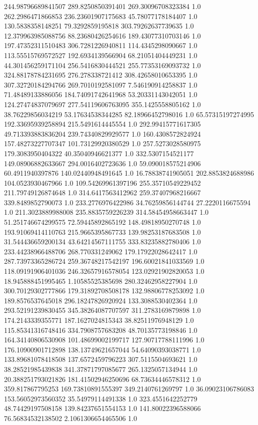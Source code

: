 244.98796689841507	289.8250850391401	269.30096708323384	1.0
262.2986471866853	236.23601907175683	45.78077178184407	1.0
130.5838358148251	79.3292859195818	303.79262637739635	1.0
12.379963985088756	88.23680426254616	189.43077310703146	1.0
197.47352311510483	306.7281226940811	114.4345298090667	1.0
113.55515769572527	192.6934139566904	68.21051404449231	1.0
44.301456259171104	256.5416830444521	255.77353169093732	1.0
324.88178784231695	276.278338721412	308.42658010653395	1.0
307.32720184294766	269.7010192581097	7.546190914258837	1.0
71.48489133886056	184.74091742641968	53.20331143042051	1.0
124.27474837079697	277.54119606763095	355.1425558805162	1.0
38.76229856034219	53.17634538344285	82.18966452798016	1.0
65.57315197274995	192.33695939258894	215.5491614445554	1.0
292.99415771617305	49.713393883836204	239.74340829929577	1.0
160.4308572824924	157.48273227707347	101.73129920380529	1.0
257.5273028580975	179.3083950404322	40.35040946621377	1.0
332.5307154521177	149.08906882633667	294.0016402723636	1.0
59.090018575214906	60.4911940397876	140.02440948491645	1.0
16.78838741905051	202.8853824688986	104.0523930467966	1.0
109.54269961397196	255.35710549229452	211.79749126874648	1.0
314.6417563412962	259.37407968216667	339.8489852790073	1.0
233.2776976422986	34.76259856144744	27.2220116675594	1.0
211.3023889988008	235.8835759226239	314.58454958663447	1.0
51.251746674299575	72.59445892865192	148.49818950270748	1.0
193.91069414110763	215.9665395867733	139.98253187683508	1.0
31.544436659200134	43.64214567111755	333.83235882780406	1.0
233.44238966488706	268.770331249062	179.17922028642417	1.0
287.73973365286724	259.36748217542197	196.60021841033569	1.0
118.09191906401036	246.32657916578054	123.02921902820053	1.0
18.945888451995465	1.10585525385698	280.32462958227904	1.0
300.70129302777866	179.31892708508178	132.98806778253092	1.0
189.8576537645018	296.18247826920924	133.3088530402364	1.0
293.52191239830455	345.38264087707597	311.2783169879898	1.0
174.2143339355771	187.1627024815343	38.82511976948129	1.0
115.85341316748416	334.7908757683208	48.70135773198846	1.0
164.34140806530908	101.48699002199717	127.90717788111996	1.0
176.10900901712898	138.13749621657044	54.64090393038771	1.0
133.89681078418508	137.6572459796223	307.5115504693621	1.0
38.28521985439838	341.37871797085677	265.1325057134944	1.0
20.388251793021826	181.41502946250696	68.73634446578312	1.0
359.817867795253	169.73810891555397	349.2140761269797	1.0
36.09023106786083	153.56052973560352	35.54979114491338	1.0
323.4551642252779	48.74429197508158	139.84237651554153	1.0
141.80022396588066	76.56834532138502	2.1061306654465506	1.0
